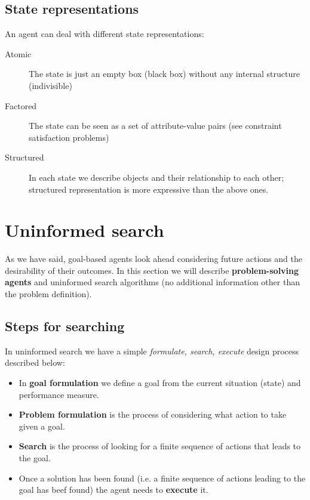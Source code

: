 \documentclass[a4paper, 11pt]{article}
\begin{document}
\subsection*{State representations}
An agent can deal with different state representations:
\begin{description}
  \item[Atomic] The state is just an empty box (black box) without any internal structure (indivisible)
  \item[Factored] The state can be seen as a set of attribute-value pairs (see constraint satisfaction problems)
  \item[Structured] In each state we describe objects and their relationship to each other; structured representation is more expressive than the above ones.
\end{description}

\section{Uninformed search}
As we have said, goal-based agents look ahead considering future actions and the desirability of their outcomes. In this section we will describe \textbf{problem-solving agents} and uninformed search algorithms (no additional information other than the problem definition).

\subsection*{Steps for searching}
In uninformed search we have a simple \emph{formulate, search, execute} design process described below:
\begin{itemize}
  \item In \textbf{goal formulation} we define a goal from the current situation (state) and performance measure.
  \item \textbf{Problem formulation} is the process of considering what action to take given a goal.
  \item \textbf{Search} is the process of looking for a finite sequence of actions that leads to the goal.
  \item Once a solution has been found (i.e. a finite sequence of actions leading to the goal has beef found) the agent needs to \textbf{execute} it.
\end{itemize}
\end{document}

